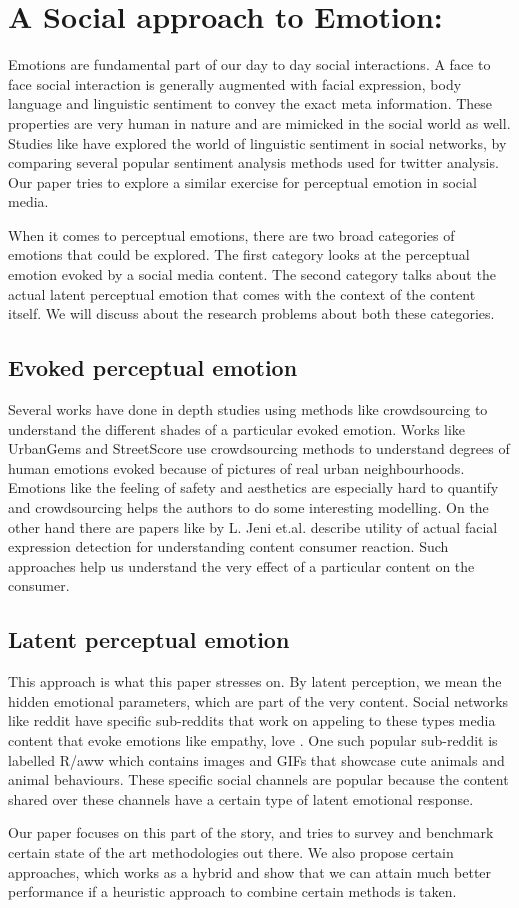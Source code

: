\section{ A Social approach to Emotion: }
Emotions are fundamental part of our day to day social interactions. A face to face social interaction is generally augmented with facial expression, body language and linguistic sentiment to convey the exact meta information. These properties are very human in nature and are mimicked in the social world as well. Studies like \cite{Joo2014b} have explored the world of linguistic sentiment in social networks, by comparing several popular sentiment analysis methods used for twitter analysis. Our paper tries to explore a similar exercise for perceptual emotion in social media. 
\par
When it comes to perceptual emotions, there are two broad categories of emotions that could be explored. The first category looks at the perceptual emotion evoked by a social media content. The second category talks about the actual latent perceptual emotion that comes with the context of the content itself. We will discuss about the research problems about both these categories.

\subsection{ Evoked perceptual emotion }
Several works have done in depth studies using methods like crowdsourcing to understand the different shades of a particular evoked emotion. Works like UrbanGems \cite{urbanGems} and StreetScore \cite{nikhil} use crowdsourcing methods to understand degrees of human emotions evoked because of pictures of real urban neighbourhoods. Emotions like the feeling of safety and aesthetics are especially hard to quantify and crowdsourcing helps the authors to do some interesting modelling. On the other hand there are papers like \cite{jeni20123d} by L. Jeni et.al. describe utility of actual facial expression detection for understanding content consumer reaction. Such approaches help us understand the very effect of a particular content on the consumer. 

\subsection{ Latent perceptual emotion }
This approach is what this paper stresses on. By latent perception, we mean the hidden emotional parameters, which are part of the very content. Social networks like reddit have specific sub-reddits that work on appeling to these types media content that evoke emotions like empathy, love . One such popular sub-reddit is labelled R/aww which contains images and GIFs that showcase cute animals and animal behaviours. These specific social channels are popular because the content shared over these channels have a certain type of latent emotional response. 
\par
Our paper focuses on this part of the story, and tries to survey and benchmark certain state of the art methodologies out there. We also propose certain approaches, which works as a hybrid and show that we can attain much better performance if a heuristic approach to combine certain methods is taken. 